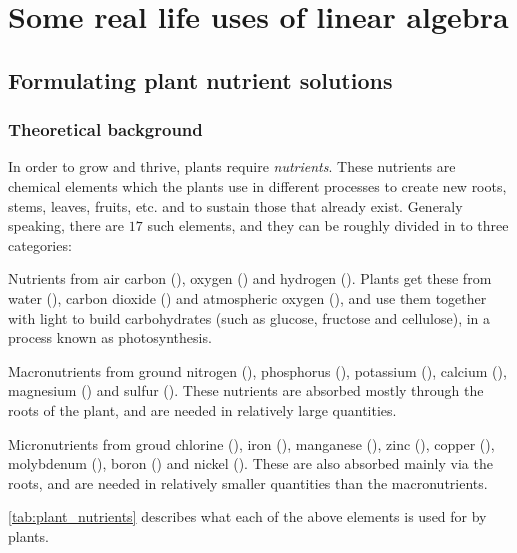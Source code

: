 \section{Some real life uses of linear algebra}
\subsection{Formulating plant nutrient solutions}
\subsubsection{Theoretical background}

In order to grow and thrive, plants require \emph{nutrients}. These nutrients are chemical elements which the plants use in different processes to create new roots, stems, leaves, fruits, etc. and to sustain those that already exist. Generaly speaking, there are $17$ such elements, and they can be roughly divided in to three categories:
\begin{descitemize}
	\item[Nutrients from air] carbon (), oxygen () and hydrogen (). Plants get these from water (), carbon dioxide () and atmospheric oxygen (), and use them together with light to build carbohydrates (such as glucose, fructose and cellulose), in a process known as photosynthesis.
	\item[Macronutrients from ground] nitrogen (), phosphorus (), potassium (), calcium (), magnesium () and sulfur (). These nutrients are absorbed mostly through the roots of the plant, and are needed in relatively large quantities.
	\item[Micronutrients from groud] chlorine (), iron (), manganese (), zinc (), copper (), molybdenum (), boron () and nickel (). These are also absorbed mainly via the roots, and are needed in relatively smaller quantities than the macronutrients.
\end{descitemize}

\autoref{tab:plant_nutrients} describes what each of the above elements is used for by plants.

